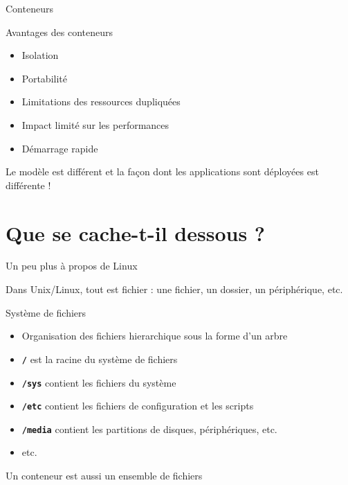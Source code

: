 \documentclass[aspectratio=169,10pt]{beamer}
\begin{document}
\begin{frame}{Conteneurs}

\begin{alertblock}{Avantages des conteneurs}
   \begin{itemize}
       \item Isolation
       \item Portabilité
       \item Limitations des ressources dupliquées
       \item Impact limité sur les performances
       \item Démarrage rapide
   \end{itemize} 
   Le modèle est différent et la façon dont les applications sont déployées est différente !
\end{alertblock}

\end{frame}


\section{Que se cache-t-il dessous ?}


\begin{frame}{Un peu plus à propos de Linux}

Dans Unix/Linux, tout est fichier : une fichier, un dossier, un 
périphérique, etc.

\begin{alertblock}{Système de fichiers}
   \begin{itemize}
       \item Organisation des fichiers hierarchique sous la forme d'un arbre
       \item \texttt{\textbf{/}} est \alert{la racine du système de fichiers}
       \item \texttt{\textbf{/sys}} contient les fichiers du système
       \item \texttt{\textbf{/etc}} contient les fichiers de configuration et les scripts
       \item \texttt{\textbf{/media}} contient les partitions de disques, périphériques, etc.
       \item etc.
   \end{itemize} 
\end{alertblock}

    \alert{Un conteneur est aussi un ensemble de fichiers}

\end{frame}
\end{document}
